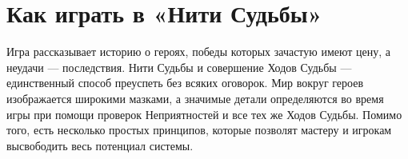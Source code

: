 \section*{Как играть в «Нити Судьбы»}
Игра рассказывает историю о героях, победы которых зачастую имеют цену, а неудачи — последствия. Нити Судьбы и совершение Ходов Судьбы — единственный способ преуспеть без всяких оговорок. Мир вокруг героев изображается широкими мазками, а значимые детали определяются во время игры при помощи проверок Неприятностей и все тех же Ходов Судьбы. Помимо того, есть несколько простых принципов, которые позволят мастеру и игрокам высвободить весь потенциал системы.